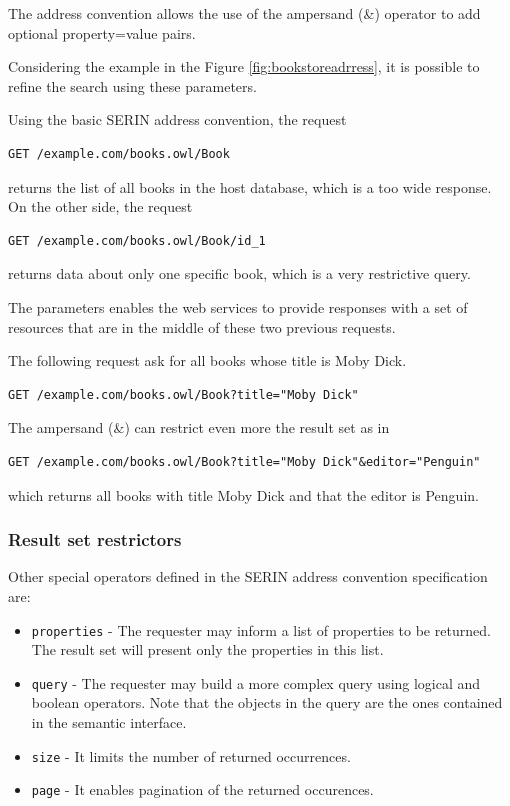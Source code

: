 \documentclass{singlecol-new}
\theoremstyle{TH}{
\newtheorem{lemma}{Lemma}
\newtheorem{theorem}[lemma]{Theorem}
\newtheorem{corrolary}[lemma]{Corrolary}
\newtheorem{conjecture}[lemma]{Conjecture}
\newtheorem{proposition}[lemma]{Proposition}
\newtheorem{claim}[lemma]{Claim}
\newtheorem{stheorem}[lemma]{Wrong Theorem}
\newtheorem{algorithm}{Algorithm}
}
\theoremstyle{THrm}{
\newtheorem{definition}{Definition}[section]
\newtheorem{question}{Question}[section]
\newtheorem{remark}{Remark}
\newtheorem{scheme}{Scheme}
}
\theoremstyle{THhit}{
\newtheorem{case}{Case}[section]
}
\begin{document}
The address convention allows the use of the ampersand (\&) operator to add optional property=value pairs.

Considering the example in the Figure \ref{fig:bookstoreadrress}, it is possible to refine the search using these parameters.

Using the basic SERIN address convention, the request 

\begin{lstlisting}
GET /example.com/books.owl/Book
\end{lstlisting}

returns the list of all books in the host database, which is a too wide response. On the other side, the request 

\begin{lstlisting}
GET /example.com/books.owl/Book/id_1
\end{lstlisting}

returns data about only one specific book, which is a very restrictive query.

The parameters enables the web services to provide responses with a set of resources that are in the middle of these two previous requests.

The following request ask for all books whose title is Moby Dick.

\begin{lstlisting}[breaklines=true]
GET /example.com/books.owl/Book?title="Moby Dick"
\end{lstlisting}

The ampersand (\&) can restrict even more the result set as in 

\begin{lstlisting}[breaklines=true]
GET /example.com/books.owl/Book?title="Moby Dick"&editor="Penguin"
\end{lstlisting}

which returns all books with title Moby Dick and that the editor is Penguin.

\subsubsection{Result set restrictors}
\label{sec:otherparam}
Other special operators defined in the SERIN address convention specification are:

\begin{itemize}
	\item \texttt{properties} - The requester may inform a list of properties to be returned. The result set will present only the properties in this list.
	\item \texttt{query} - The requester may build a more complex query using logical and boolean operators. Note that the objects in the query are the ones contained in the semantic interface.
	\item \texttt{size} - It limits the number of returned occurrences.
	\item \texttt{page} - It enables pagination of the returned occurences.
\end{itemize}
\end{document}
